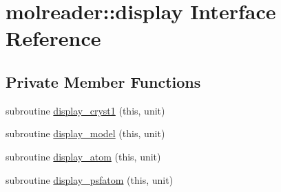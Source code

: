 \hypertarget{interfacemolreader_1_1display}{\section{molreader\+:\+:display Interface Reference}
\label{interfacemolreader_1_1display}
}
\subsection*{Private Member Functions}
\begin{DoxyCompactItemize}
\item 
subroutine \hyperlink{interfacemolreader_1_1display_a367a91877524a939c53cd58ce8ac0635}{display\+\_\+cryst1} (this, unit)
\item 
subroutine \hyperlink{interfacemolreader_1_1display_af76b8884f32bae6a2a70d92dea1e884d}{display\+\_\+model} (this, unit)
\item 
subroutine \hyperlink{interfacemolreader_1_1display_a9e155fe19986dcbbceeccb957eb9eedb}{display\+\_\+atom} (this, unit)
\item 
subroutine \hyperlink{interfacemolreader_1_1display_a0f0d826e10fcae2957860b21580f136a}{display\+\_\+psfatom} (this, unit)
\end{DoxyCompactItemize}



